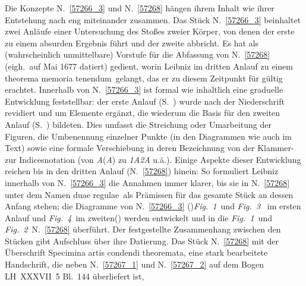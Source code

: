 %  
%			
%
%
%
\frenchspacing
%
\begin{ledgroup}
\footnotesize
%
%
\pstart\noindent
Die Konzepte N.~\ref{57266_3} und N.~\ref{57268} hängen ihrem Inhalt wie ihrer Entstehung nach eng miteinander zusammen. 
%
Das Stück N.~\ref{57266_3} beinhaltet zwei Anläufe einer Untersuchung des Stoßes zweier Körper,
%
von denen der erste zu einem absurden Ergebnis führt und der zweite abbricht.
%
Es hat als (wahrscheinlich unmittelbare) Vorstufe für die Abfassung von  N.~\ref{57268} (eigh.\ auf Mai 1677 datiert)  gedient,
%
worin Leibniz im dritten Anlauf zu einem \glqq theorema memoria tenendum\grqq\ gelangt, das er zu diesem Zeitpunkt  für gültig erachtet.
%
Innerhalb von N.~\ref{57266_3} ist formal wie inhaltlich eine graduelle Entwicklung feststellbar: 
%
der erste Anlauf (S.~) wurde nach der Niederschrift revidiert und um Elemente ergänzt,
%
die wiederum die Basis für den zweiten Anlauf (S.~) bildeten.
%
Dies umfasst die Streichung oder Umarbeitung der Figuren, 
%
die Umbenennung einzelner Punkte (in den Diagrammen wie auch im Text) sowie 
%
eine formale Verschiebung in deren Bezeichnung von der Klammer- zur Indicesnotation
%
(von \textit{A}(\textit{A}) zu \textit{{\scriptsize 1}A{\scriptsize 2}A} u.ä.).
%
Einige Aspekte dieser Entwicklung reichen bis in den dritten Anlauf (N.~\ref{57268}) hinein:
%
So formuliert Leibniz innerhalb von N.~\ref{57266_3} die Annahmen immer klarer,
%
bis sie in N.~\ref{57268} unter dem Namen \glqq duae regulae\grqq\ als Prämissen für das gesamte Stück an dessen Anfang stehen;
%
die Diagramme von N.~\ref{57266_3} (\protect\vphantom)\lbrack\textit{Fig.~1}\rbrack\ und \lbrack\textit{Fig.~3}\rbrack\ 
%
im ersten Anlauf und \lbrack\textit{Fig.~4}\rbrack\ im zweiten\protect\vphantom() 
%
werden entwickelt und in die \lbrack\textit{Fig.~1}\rbrack\ und \lbrack\textit{Fig.~2}\rbrack\ N.~\ref{57268}  überführt.
\pend
%
\pstart
Der festgestellte Zusammenhang zwischen den Stücken gibt Aufschluss über ihre Datierung.
%
Das Stück N.~\ref{57268} mit der Überschrift \glqq Specimina artis condendi theoremata\grqq, 
%
eine stark bearbeitete Handschrift, die neben N.~\ref{57267_1} und N.~\ref{57267_2} auf dem Bogen LH~XXXVII~5 Bl.~144 überliefert ist, 

\end{ledgroup}

